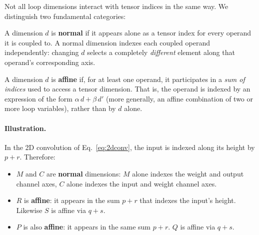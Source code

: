 Not all loop dimensions interact with tensor indices in the same way.
We distinguish two fundamental categories:

\begin{definition}
\label{def:normal-dim}
A dimension $d$ is \textbf{normal} if it appears alone as a tensor index
for every operand it is coupled to.
A normal dimension indexes each coupled operand independently: changing
$d$ selects a completely \emph{different} element along that operand's
corresponding axis.
\end{definition}

\begin{definition}
\label{def:affine-dim}
A dimension $d$ is \textbf{affine} if, for at least one operand, it
participates in a \emph{sum of indices} used to access a tensor
dimension.
That is, the operand is indexed by an expression of the form
$\alpha\, d + \beta \,d'$ (more generally, an affine combination of
two or more loop variables), rather than by $d$ alone.
\end{definition}

\paragraph{Illustration.}
In the 2D convolution of Eq.~\eqref{eq:2dconv}, the input
is indexed along its height by $p + r$.
Therefore:
\begin{itemize}
  \item $M$ and $C$ are \textbf{normal} dimensions: $M$ alone
    indexes the weight and output channel axes, $C$ alone indexes the
    input and weight channel axes.
  \item $R$ is \textbf{affine}: it appears in the sum $p + r$ that
    indexes the input's height.
    Likewise $S$ is affine via $q + s$.
  \item $P$ is also \textbf{affine}: it appears in the same sum $p + r$.
    $Q$ is affine via $q + s$.
\end{itemize}

